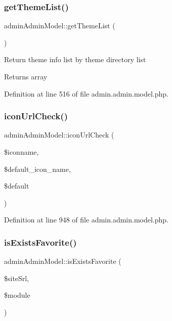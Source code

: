 \mbox{\label{classadminAdminModel_a2a331c8f7fea9c12f56f5f5f75a3960c}} 
\subsubsection{\texorpdfstring{get\+Theme\+List()}{getThemeList()}}
{\footnotesize\ttfamily admin\+Admin\+Model\+::get\+Theme\+List (\begin{DoxyParamCaption}{ }\end{DoxyParamCaption})}

Return theme info list by theme directory list \begin{DoxyReturn}{Returns}
array 
\end{DoxyReturn}


Definition at line 516 of file admin.\+admin.\+model.\+php.

\mbox{\label{classadminAdminModel_ab77b7dd452e81ca285debe37a159e0d7}} 
\subsubsection{\texorpdfstring{icon\+Url\+Check()}{iconUrlCheck()}}
{\footnotesize\ttfamily admin\+Admin\+Model\+::icon\+Url\+Check (\begin{DoxyParamCaption}\item[{}]{\$iconname,  }\item[{}]{\$default\+\_\+icon\+\_\+name,  }\item[{}]{\$default }\end{DoxyParamCaption})}



Definition at line 948 of file admin.\+admin.\+model.\+php.

\mbox{\label{classadminAdminModel_a6ba3dfaa5f5f1cc41284676b9e0b7b9d}} 
\subsubsection{\texorpdfstring{is\+Exists\+Favorite()}{isExistsFavorite()}}
{\footnotesize\ttfamily admin\+Admin\+Model\+::is\+Exists\+Favorite (\begin{DoxyParamCaption}\item[{}]{\$site\+Srl,  }\item[{}]{\$module }\end{DoxyParamCaption})}

